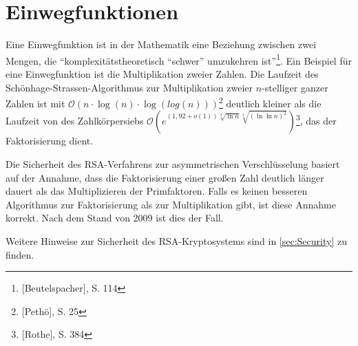 \section{Einwegfunktionen}
Eine Einwegfunktion ist in der Mathematik eine Beziehung zwischen
zwei Mengen, die "`komplexitätstheoretisch "`schwer"' umzukehren ist"'\footnote{[Beutelspacher], S. 114}.
Ein Beispiel für eine Einwegfunktion ist die Multiplikation zweier
Zahlen. Die Laufzeit des Schönhage-Strassen-Algorithmus zur
Multiplikation zweier $n$-stelliger ganzer Zahlen ist mit
$\mathcal{O}(n \cdot \log(n) \cdot \log(log(n)))$\footnote{[Pethö], S. 25}
deutlich kleiner als die Laufzeit von  des Zahlkörpersiebs
$\mathcal{O}(e^{(1,92+o(1)) \sqrt[3]{\ln n} \sqrt[3]{(\ln \ln n)^2}})$\footnote{[Rothe], S. 384},
das der Faktorisierung dient.

Die Sicherheit des RSA-Verfahrens zur asymmetrischen
Verschlüsselung basiert auf der Annahme, dass die Faktorisierung
einer großen Zahl deutlich länger dauert als das Multiplizieren der
Primfaktoren. Falls es keinen besseren Algorithmus zur Faktorisierung
als zur Multiplikation gibt, ist diese Annahme korrekt. Nach dem
Stand von 2009 ist dies der Fall.

Weitere Hinweise zur Sicherheit des RSA-Kryptosystems sind in \cref{sec:Security} zu finden.
